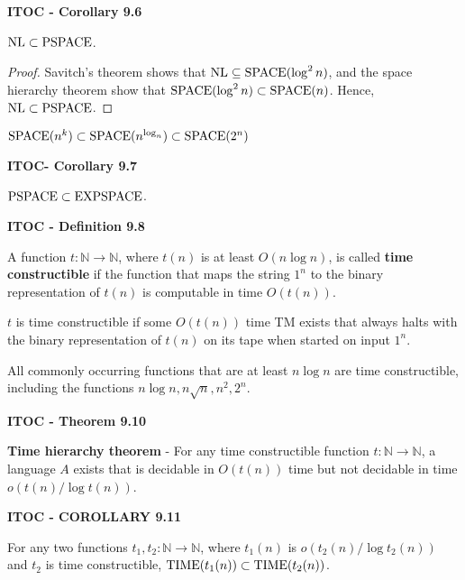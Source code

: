 \begin{shaded}
\textbf{ITOC - Corollary 9.6}

\medskip
$\text{NL} \subset \text{PSPACE}$.
\end{shaded}

\begin{mdframed}
\begin{proof}
Savitch's theorem shows that $\text{NL} \subseteq \text{SPACE}(\log^2 n)$, and the space hierarchy theorem show that $\text{SPACE}(\log^2 n) \subset \text{SPACE}(n)$. Hence, $\text{NL} \subset \text{PSPACE}$.
\end{proof}
\end{mdframed}

{\color{blue} $\text{SPACE}(n^k) \subset \text{SPACE}(n^{\log_n}) \subset \text{SPACE}(2^n)$}

\begin{shaded}
\textbf{ITOC- Corollary 9.7}

\medskip
$\text{PSPACE} \subset \text{EXPSPACE}$. 
\end{shaded}

\begin{shaded}
\textbf{ITOC - Definition 9.8}

\medskip
A function $t: \mathbb{N} \rightarrow \mathbb{N}$, where $t(n)$ is at least $O(n \log n)$, is called \textbf{time constructible} if the function that maps the string $1^n$ to the binary representation of $t(n)$ is computable in time $O(t(n))$.
\end{shaded}

$t$ is time constructible if some $O(t(n))$ time TM exists that always halts with the binary representation of $t(n)$ on its tape when started on input $1^n$.

{\color{blue} All commonly occurring functions that are at least $n\log n$ are time constructible, including the functions $n\log n, n\sqrt{n}, n^2, 2^n$.}

\begin{shaded}
\textbf{ITOC - Theorem 9.10}

\medskip
\textbf{Time hierarchy theorem} - For any time constructible function $t: \mathbb{N} \rightarrow \mathbb{N}$, a language $A$ exists that is decidable in $O(t(n))$ time but not decidable in time $o(t(n) / \log t(n))$.
\end{shaded}


\begin{shaded}
\textbf{ITOC - COROLLARY 9.11}

\medskip
For any two functions $t_1, t_2: \mathbb{N} \rightarrow \mathbb{N}$, where $t_1(n)$ is $o(t_2(n) / \log t_2(n))$ and $t_2$ is time constructible, $\text{TIME}(t_1(n)) \subset \text{TIME} (t_2(n))$.
\end{shaded}

